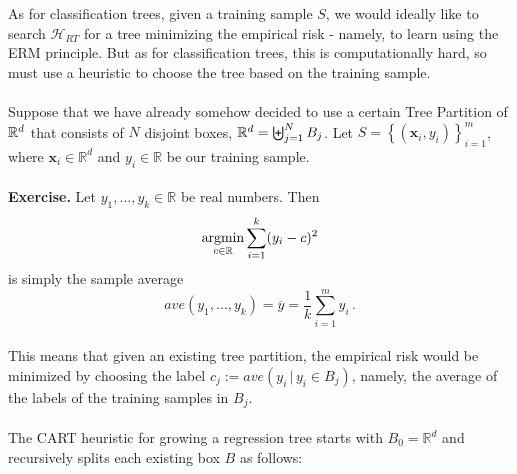 \documentclass[11pt]{article}
\newcommand{\R}{\ensuremath{\mathbb{R}}}
\newcommand{\Hc}{\mathcal{H}}
\newcommand{\VV}[1]{\mathbf{#1}}
\begin{document}
    As for classification trees, given a training sample $S$,
     we would ideally like to search $\Hc_{RT}$ for a tree minimizing the
     empirical risk - namely, to learn using the ERM principle. But as for
     classification trees, this is computationally hard, so must use a heuristic
     to choose the tree based on the training sample.
\\~\\
     Suppose that we have already somehow 
 decided to use a certain Tree Partition of $\mathbb{R}^d$ that consists of $N$ disjoint boxes,
 $\mathbb{R}^d=\biguplus_{j=1}^N B_j$. Let $S=\left\{ (\VV{x}_i,y_i)
 \right\}_{i=1}^m$, where $\VV{x}_i\in \R^d$ and $y_i\in\R$ be our training sample.
\\~\\
 {\bf Exercise.} Let $y_1,\ldots,y_k\in\R$ be real numbers. Then
 \[
   \argmin_{c\in\R} \sum_{i=1}^k (y_i-c)^2
 \]
 is simply the sample average
 \[
   ave(y_1,\ldots,y_k) = \overline{y} = \frac{1}{k}\sum_{i=1}^m y_i\,.
 \]
~\\
 This means that given an existing tree partition, the empirical risk would be
 minimized by choosing the label $c_j:= ave(y_i \,|\, y_i\in B_j)$, namely, the
 average of the labels of the training samples in $B_j$.
\\~\\
 The CART heuristic for growing a regression tree starts with $B_0=\R^d$ and recursively splits each existing
 box $B$ as follows:
\end{document}
